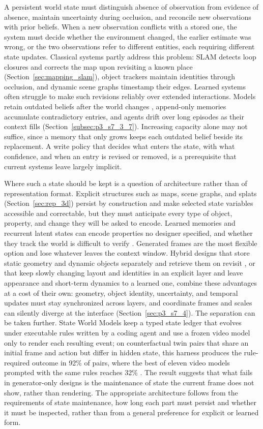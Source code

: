 A persistent world state must distinguish absence of observation from evidence of absence, maintain uncertainty during occlusion, and reconcile new observations with prior beliefs.
When a new observation conflicts with a stored one, the system must decide whether the environment changed, the earlier estimate was wrong, or the two observations refer to different entities, each requiring different state updates.
Classical systems partly address this problem: SLAM detects loop closures and corrects the map upon revisiting a known place (Section~\ref{sec:mapping_slam}), object trackers maintain identities through occlusion, and dynamic scene graphs timestamp their edges.
Learned systems often struggle to make such revisions reliably over extended interactions.
Models retain outdated beliefs after the world changes \cite{zhang2026theory}, append-only memories accumulate contradictory entries, and agents drift over long episodes as their context fills (Section~\ref{subsec:p3_s7_3_7}).
Increasing capacity alone may not suffice, since a memory that only grows keeps each outdated belief beside its replacement.
A write policy that decides what enters the state, with what confidence, and when an entry is revised or removed, is a prerequisite that current systems leave largely implicit.

Where such a state should be kept is a question of architecture rather than of representation format.
Explicit structures such as maps, scene graphs, and splats (Section~\ref{sec:rep_3d}) persist by construction and make selected state variables accessible and correctable, but they must anticipate every type of object, property, and change they will be asked to encode.
Learned memories and recurrent latent states can encode properties no designer specified, and whether they track the world is difficult to verify \cite{gonzalezlaiz2026limits}.
Generated frames are the most flexible option and lose whatever leaves the context window.
Hybrid designs that store static geometry and dynamic objects separately and retrieve them on revisit \cite{yu2026grome}, or that keep slowly changing layout and identities in an explicit layer and leave appearance and short-term dynamics to a learned one, combine these advantages at a cost of their own: geometry, object identity, uncertainty, and temporal updates must stay synchronized across layers, and coordinate frames and scales can silently diverge at the interface (Section~\ref{sec:p3_s7_4}).
The separation can be taken further.
State World Models keep a typed state ledger that evolves under executable rules written by a coding agent and use a frozen video model only to render each resulting event; on counterfactual twin pairs that share an initial frame and action but differ in hidden state, this harness produces the rule-required outcome in 92\% of pairs, where the best of eleven video models prompted with the same rules reaches 32\% \cite{chan2026stateworld}.
The result suggests that what fails in generator-only designs is the maintenance of state the current frame does not show, rather than rendering.
The appropriate architecture follows from the requirements of state maintenance, how long each part must persist and whether it must be inspected, rather than from a general preference for explicit or learned form.

